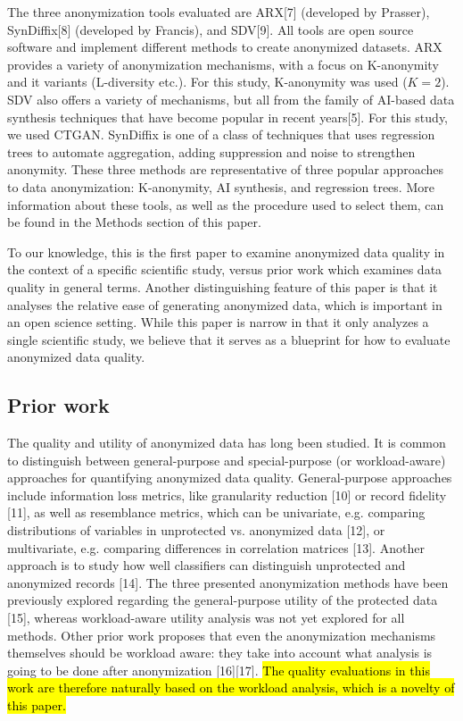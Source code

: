 \documentclass[10pt]{article}
\newcommand{\mycite}[1]{[#1]}
\newcommand{\hlmay}[1]{#1}
\begin{document}
The three anonymization tools evaluated are ARX\mycite{7} (developed by Prasser), SynDiffix\mycite{8} (developed by Francis), and SDV\mycite{9}. All tools are open source software and implement different methods to create anonymized datasets. \hlmay{
ARX provides a variety of anonymization mechanisms, with a focus on K-anonymity and it variants (L-diversity etc.). For this study, K-anonymity was used ($K=2$). SDV also offers a variety of mechanisms, but all from the family of AI-based data synthesis techniques that have become popular in recent years}\mycite{5}. \hlmay{For this study, we used CTGAN. SynDiffix is one of a class of techniques that uses regression trees to automate aggregation, adding suppression and noise to strengthen anonymity. These three methods are representative of three popular approaches to data anonymization: K-anonymity, AI synthesis, and regression trees.} More information about these tools, as well as the procedure used to select them, can be found in the Methods section of this paper.

\hlmay{To our knowledge, this is the first paper to examine anonymized data quality in the context of a specific scientific study, versus prior work which examines data quality in general terms. Another distinguishing feature of this paper is that it analyses the relative ease of generating anonymized data, which is important in an open science setting. While this paper is narrow in that it only analyzes a single scientific study, we believe that it serves as a blueprint for how to evaluate anonymized data quality.}

\subsection*{\hlmay{Prior work}}

\hlmay{The quality and utility of anonymized data has long been studied. It is common to distinguish between general-purpose and special-purpose (or workload-aware) approaches for quantifying anonymized data quality. General-purpose approaches include information loss metrics, like granularity reduction} \mycite{10} or record fidelity \mycite{11}, \hlmay{as well as resemblance metrics, which can be univariate, e.g. comparing distributions of variables in unprotected vs. anonymized data} \mycite{12}, \hlmay{or multivariate, e.g. comparing differences in correlation matrices} \mycite{13}. \hlmay{Another approach is to study how well classifiers can distinguish unprotected and anonymized records} \mycite{14}. The three presented anonymization methods have been previously explored regarding the general-purpose utility of the protected data \mycite{15}, whereas workload-aware utility analysis was not yet explored for all methods. 
\hlmay{Other prior work proposes that even the anonymization mechanisms themselves should be workload aware: they take into account what analysis is going to be done after anonymization} \mycite{16}\mycite{17}. \hl{The quality evaluations in this work are therefore naturally based on the workload analysis, which is a novelty of this paper.}
\end{document}
